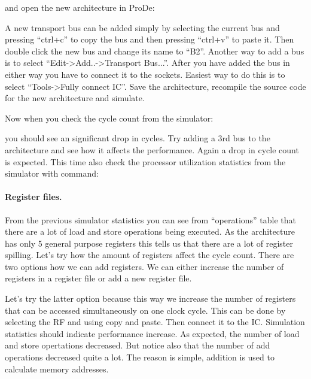 \documentclass[twoside]{tceusermanual}
\begin{document}

and open the new architecture in ProDe:


A new transport bus can be added simply by selecting the current bus and
pressing ``ctrl+c'' to copy the bus and then pressing ``ctrl+v'' to paste it.
Then double click the new bus and change its name to ``B2''.
Another way to add a bus is to select ``Edit->Add..->Transport Bus...''.
After you have added the bus in either way you have to connect it to the
sockets. Easiest way to do this is to select ``Tools->Fully connect IC''.
Save the architecture, recompile the source code for the new architecture
and simulate.



Now when you check the cycle count from the simulator:


you should see an significant drop in cycles. Try adding a 3rd bus to the
architecture and see how it affects the performance. Again a drop in cycle
count is expected. This time also check the processor utilization statistics
from the simulator with command:


\paragraph{Register files.}
From the previous simulator statistics you can see from ``operations'' table
that there are a lot of load and store operations being executed. As the
architecture has only 5 general purpose registers this tells us that there
are a lot of register spilling. Let's try how the amount of registers affect
the cycle count. There are two options how we can add registers. We can either
increase the number of registers in a register file or add a new register file.

Let's try the latter option because this way we increase the number of registers
that can be accessed simultaneously on one clock cycle. This can be done by
selecting the RF and using copy and paste. Then connect it to the IC.
Simulation statistics should indicate performance increase. As expected, the
number of load and store opertations decreased. But notice also that the number
of add operations decreased quite a lot. The reason is simple, addition is used
to calculate memory addresses.
\end{document}
